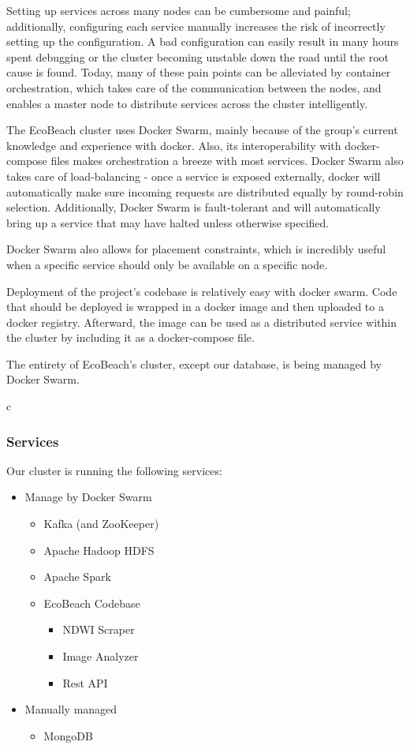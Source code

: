 Setting up services across many nodes can be cumbersome and painful; additionally, configuring each service manually increases the risk of incorrectly setting up the configuration. A bad configuration can easily result in many hours spent debugging or the cluster becoming unstable down the road until the root cause is found. 
Today, many of these pain points can be alleviated by container orchestration, which takes care of the communication between the nodes, and enables a master node to distribute services across the cluster intelligently. 


The EcoBeach cluster uses Docker Swarm, mainly because of the group's current knowledge and experience with docker. Also, its interoperability with docker-compose files makes orchestration a breeze with most services. Docker Swarm also takes care of load-balancing - once a service is exposed externally, docker will automatically make sure incoming requests are distributed equally by round-robin selection. Additionally, Docker Swarm is fault-tolerant and will automatically bring up a service that may have halted unless otherwise specified. 

Docker Swarm also allows for placement constraints, which is incredibly useful when a specific service should only be available on a specific node.

Deployment of the project's codebase is relatively easy with docker swarm. Code that should be deployed is wrapped in a docker image and then uploaded to a docker registry. Afterward, the image can be used as a distributed service within the cluster by including it as a docker-compose file. 

The entirety of EcoBeach's cluster, except our database, is being managed by Docker Swarm. 

c\subsubsection*{Services}

Our cluster is running the following services:

\begin{itemize}
    \item Manage by Docker Swarm
    \begin{itemize}
        \item Kafka (and ZooKeeper)
        \item Apache Hadoop HDFS
        \item Apache Spark
        \item EcoBeach Codebase
        \begin{itemize}
            \item NDWI Scraper
            \item Image Analyzer
            \item Rest API
        \end{itemize}
    \end{itemize}
    \item Manually managed
    \begin{itemize}
        \item MongoDB
    \end{itemize}
\end{itemize}

